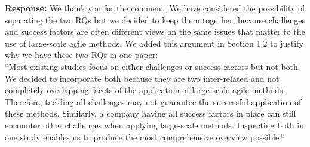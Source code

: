 \documentclass[a4paper,twoside,11pt]{reviewresponse}
\begin{document}
\textbf{Response:}
We thank you for the comment. We have considered the possibility of separating the two RQs but we decided to keep them together, because challenges and success factors are often different views on the same issues that matter to the use of large-scale agile methods. We added this argument in Section 1.2 to justify why we have these two RQs in one paper:\\
``Most existing studies focus on either challenges or success factors but not both. We decided to incorporate both because they are two inter-related and not completely overlapping facets of the application of large-scale agile methods. Therefore, tackling all challenges may not guarantee the successful application of these methods. Similarly, a company having all success factors in place can still encounter other challenges when applying large-scale methods. Inspecting both in one study enables us to produce the most comprehensive overview possible.''
\end{document}
